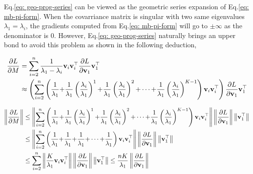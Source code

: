 Eq.\ref{eq: geo-prog-series} can be viewed as the geometric series expansion of Eq.\ref{eq: mb-pi-form}.
When the covarriance matrix is singular with two same eigenvalues $\lambda_1 = \lambda_i$, the gradients computed from Eq.\ref{eq: mb-pi-form} will go to $\pm \infty$ as the denominator is 0. However, Eq.\ref{eq: geo-prog-series} naturally brings an upper bond to avoid this problem as shown in the following deduction,

	\begin{equation}
	\begin{aligned}
	\frac{\partial L}{\partial M} & = \sum_{i=2}^{n}\frac{1}{\lambda_{1}-\lambda_{i}}\mathbf{v}_{i}\mathbf{v}_{i}^{\top}\frac{\partial L}{\partial \mathbf{v}_{1}}\mathbf{v}_{1}^{\top} \\
	&\approx \left(\sum_{i=2}^{n}\left(
	\frac{1}{\lambda_{1}} {+}
	\frac{1}{\lambda_{1}}\left(\frac{\lambda_{i}}{\lambda_{1}}\right)^{1} {+}
	\frac{1}{\lambda_{1}}\left(\frac{\lambda_{i}}{\lambda_{1}}\right)^{2} {+} \cdots {+}
	\frac{1}{\lambda_{1}}\left(\frac{\lambda_{i}}{\lambda_{1}}\right)^{K-1}
	\right)\mathbf{v}_{i}\mathbf{v}_{i}^{\top}
	\right)\frac{\partial L}{\partial \mathbf{v}_{1}}\mathbf{v}_{1}^{\top}
	\end{aligned}
	\end{equation}
	
	\begin{equation}
	\begin{aligned}
	\left\| \frac{\partial L}{\partial M} \right\|
	& \leq \left\| \sum_{i=2}^{n}\left(
	\frac{1}{\lambda_{1}} {+}
	\frac{1}{\lambda_{1}}\left(\frac{\lambda_{i}}{\lambda_{1}}\right)^{1} {+}
	\frac{1}{\lambda_{1}}\left(\frac{\lambda_{i}}{\lambda_{1}}\right)^{2} {+} \cdots {+}
	\frac{1}{\lambda_{1}}\left(\frac{\lambda_{i}}{\lambda_{1}}\right)^{K-1}
	\right)\mathbf{v}_{i}\mathbf{v}_{i}^{\top}
	\right\| \left\|  \frac{\partial L}{\partial \mathbf{v}_{1}} \right\|  \left\|  \mathbf{v}_{1}^{\top} \right\| \\
	& \leq \left\| \sum_{i=2}^{n}\left(
	\frac{1}{\lambda_{1}} {+}
	\frac{1}{\lambda_{1}} {+}
	\frac{1}{\lambda_{1}} {+} \cdots {+}
	\frac{1}{\lambda_{1}}
	\right)\mathbf{v}_{i}\mathbf{v}_{i}^{\top}
	\right\| \left\|  \frac{\partial L}{\partial \mathbf{v}_{1}} \right\|  \left\|  \mathbf{v}_{1}^{\top} \right\| \\
	 & \leq \sum_{i=2}^{n} \left\| 
	\frac{K}{\lambda_{1}}
	\mathbf{v}_{i}\mathbf{v}_{i}^{\top}
	\right\| \left\|  \frac{\partial L}{\partial \mathbf{v}_{1}} \right\|  \left\|  \mathbf{v}_{1}^{\top} \right\|  
	\leq \frac{nK}{\lambda_{1}} \left\|  \frac{\partial L}{\partial \mathbf{v}_{1}} \right\|
	\end{aligned}
	\end{equation}

